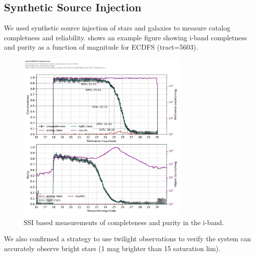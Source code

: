 \subsection{Synthetic Source Injection}

We used synthetic source injection of stars and galaxies to measure catalog completness and reliability.
 shows an example figure showing i-band completness and purity as a function of magnitude for ECDFS (tract=5603).
\begin{figure}
  \centering
    \includegraphics[width=0.75\textwidth]{sample_production_figures/matched_ref_completness_ssi_i.png}
    \caption{SSI based measurements of completeness and purity in the i-band.}
    \label{fig:ssi_comp}
\end{figure}

We also confirmed a strategy to use twilight observations to verify the system can accurately observe bright stars (1 mag brighter than 15 saturation lim).
